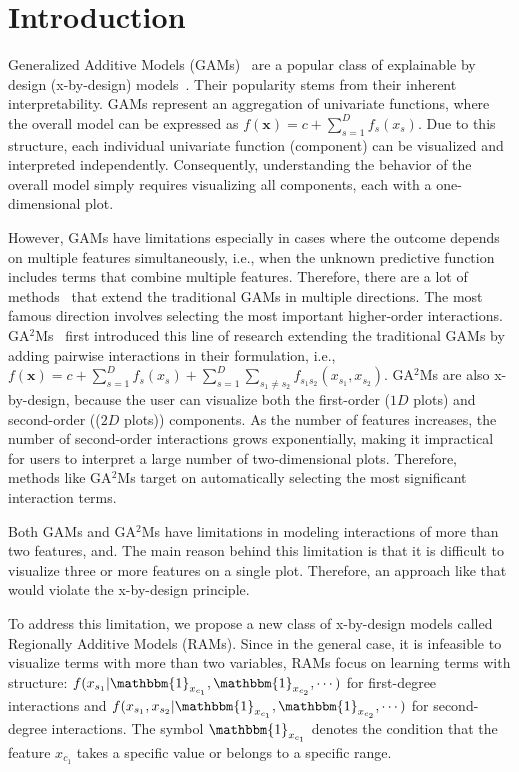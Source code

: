 \documentclass[runningheads]{llncs}
\newcommand{\xb}{\mathbf{x}}
\newcommand{\when}[1]{\mathbbm{1}_{#1}}
\begin{document}
\section{Introduction}
\label{sec:intro}

Generalized Additive Models (GAMs)~\citep{hastie1987generalized} are a popular class of explainable by design
(x-by-design) models~\citep{rudin2019stop, ghassemi2021false}.
Their popularity stems from their inherent interpretability.
GAMs represent an aggregation of univariate functions, where the overall model can be expressed as
\(f(\xb) = c + \sum_{s=1}^D f_s(x_s)\).
Due to this structure, each individual univariate function (component) can be visualized and interpreted independently.
Consequently, understanding the behavior of the overall model simply requires visualizing all components, each with a one-dimensional plot.

However, GAMs have limitations especially in cases where the outcome depends on multiple features simultaneously, i.e., when the unknown predictive function includes terms that combine multiple features. Therefore, there are a lot of methods~\citep{enouen2022sparse, xu2023sparse, lou2013accurate, agarwal2021neural, chang2021node} that extend the traditional GAMs in multiple directions. The most famous direction involves selecting the most important higher-order interactions. GA$^2$Ms~\citep{lou2013accurate} first introduced this line of research extending the traditional GAMs by adding pairwise interactions in their
    formulation, i.e., \(f(\xb) = c + \sum_{s=1}^D f_s(x_s) + \sum_{s=1}^D \sum_{s_1 \neq s_2} f_{s_1 s_2}(x_{s_1}, x_{s_2})\).
GA$^2$Ms are also x-by-design, because the user can visualize both the first-order ($1D$ plots) and
second-order (($2D$ plots)) components.
As the number of features increases, the number of second-order interactions grows exponentially,
making it impractical for users to interpret a large number of two-dimensional plots.
Therefore, methods like GA$^2$Ms target on automatically selecting the most significant interaction terms.

Both GAMs and GA$^2$Ms have limitations in modeling interactions of more than two features,
and. The main reason behind this limitation is that it is difficult to visualize three or more features on a single plot. Therefore, an approach like that would violate the x-by-design principle.

To address this limitation, we propose a new class of x-by-design models called Regionally Additive Models (RAMs).
Since in the general case, it is infeasible to visualize terms with more than two variables, RAMs focus on learning terms with structure:
$f(x_{s_1} | \when{x_{c_1}}, \when{x_{c_2}}, \cdots)$ for first-degree interactions and
$f(x_{s_1}, x_{s_2} | \when{x_{c_1}}, \when{x_{c_2}}, \cdots)$ for second-degree interactions.
The symbol $\when{x_{c_1}}$ denotes the condition that the feature $x_{c_1}$ takes a specific value or belongs to a specific range.
\end{document}
